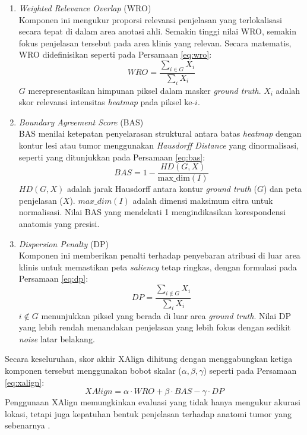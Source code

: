 \begin{enumerate}
	\begin{enumerate}
		\item \textit{Weighted Relevance Overlap} (WRO) \\
		Komponen ini mengukur proporsi relevansi penjelasan yang terlokalisasi secara tepat di dalam area anotasi ahli. Semakin tinggi nilai WRO, semakin fokus penjelasan tersebut pada area klinis yang relevan. Secara matematis, WRO didefinisikan seperti pada Persamaan \ref{eq:wro}:
		\begin{equation}
			WRO = \frac{\sum_{i \in G} X_{i}}{\sum_{i} X_{i}}
			\label{eq:wro}
		\end{equation}
		$G$ merepresentasikan himpunan piksel dalam masker \textit{ground truth}. $X_i$ adalah skor relevansi intensitas \textit{heatmap} pada piksel ke-$i$.
		
		\item \textit{Boundary Agreement Score} (BAS) \\
		BAS menilai ketepatan penyelarasan struktural antara batas \textit{heatmap} dengan kontur lesi atau tumor menggunakan \textit{Hausdorff Distance} yang dinormalisasi, seperti yang ditunjukkan pada Persamaan \ref{eq:bas}:
		\begin{equation}
			BAS = 1 - \frac{HD(G, X)}{\text{max\_dim}(I)}
			\label{eq:bas}
		\end{equation}
		$HD(G, X)$ adalah jarak Hausdorff antara kontur \textit{ground truth} ($G$) dan peta penjelasan ($X$). $max\_dim(I)$ adalah dimensi maksimum citra untuk normalisasi. Nilai BAS yang mendekati 1 mengindikasikan korespondensi anatomis yang presisi.
		
		\item \textit{Dispersion Penalty} (DP) \\
		Komponen ini memberikan penalti terhadap penyebaran atribusi di luar area klinis untuk memastikan peta \textit{saliency} tetap ringkas, dengan formulasi pada Persamaan \ref{eq:dp}:
		\begin{equation}
			DP = \frac{\sum_{i \notin G} X_{i}}{\sum_{i} X_{i}}
			\label{eq:dp}
		\end{equation}
		$i \notin G$ menunjukkan piksel yang berada di luar area \textit{ground truth}. Nilai DP yang lebih rendah menandakan penjelasan yang lebih fokus dengan sedikit \textit{noise} latar belakang.\\
	\end{enumerate}
	
	Secara keseluruhan, skor akhir XAlign dihitung dengan menggabungkan ketiga komponen tersebut menggunakan bobot skalar ($\alpha, \beta, \gamma$) seperti pada Persamaan \ref{eq:xalign}:
	\begin{equation}
		XAlign = \alpha \cdot WRO + \beta \cdot BAS - \gamma \cdot DP
		\label{eq:xalign}
	\end{equation}
	Penggunaan XAlign memungkinkan evaluasi yang tidak hanya mengukur akurasi lokasi, tetapi juga kepatuhan bentuk penjelasan terhadap anatomi tumor yang sebenarnya \autocite{muhammad2025heatmap}.
\end{enumerate}

